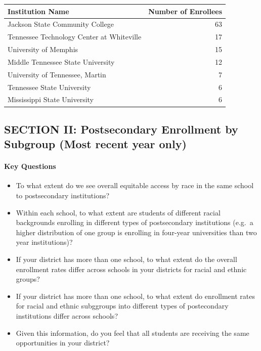 \documentclass[11pt,]{article}
\providecommand{\tightlist}{%
  \setlength{\itemsep}{0pt}\setlength{\parskip}{0pt}}
\let\oldparagraph\paragraph
\renewcommand{\paragraph}[1]{\oldparagraph{#1}\mbox{}}
\begin{document}
\begin{longtable}[]{@{}lr@{}}
\toprule
Institution Name & Number of Enrollees\tabularnewline
\midrule
\endhead
Jackson State Community College & 63\tabularnewline
Tennessee Technology Center at Whiteville & 17\tabularnewline
University of Memphis & 15\tabularnewline
Middle Tennessee State University & 12\tabularnewline
University of Tennessee, Martin & 7\tabularnewline
Tennessee State University & 6\tabularnewline
Mississippi State University & 6\tabularnewline
\bottomrule
\end{longtable}

\subsection{SECTION II: Postsecondary Enrollment by Subgroup (Most
recent year
only)}\label{section-ii-postsecondary-enrollment-by-subgroup-most-recent-year-only}

\paragraph{Key Questions}\label{key-questions-2}

\begin{itemize}
\tightlist
\item
  To what extent do we see overall equitable access by race in the same
  school to postsecondary institutions?
\item
  Within each school, to what extent are students of different racial
  backgrounds enrolling in different types of postsecondary institutions
  (e.g.~a higher distribution of one group is enrolling in four-year
  universities than two year institutions)?
\item
  If your district has more than one school, to what extent do the
  overall enrollment rates differ across schools in your districts for
  racial and ethnic groups?
\item
  If your district has more than one school, to what extent do
  enrollment rates for racial and ethnic subggroups into different types
  of postecondary institutions differ across schools?
\item
  Given this information, do you feel that all students are receiving
  the same opportunities in your district?
\end{itemize}
\end{document}
